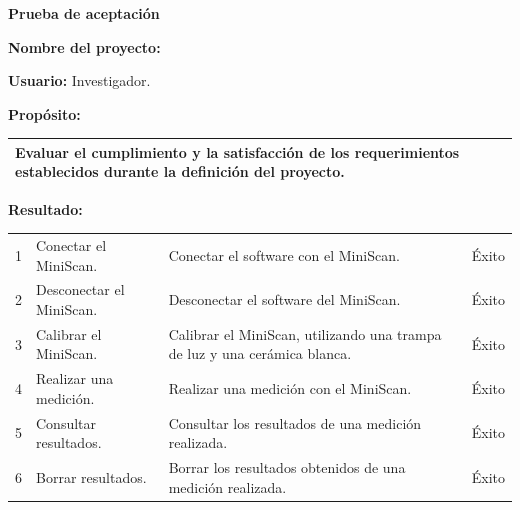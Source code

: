 {\newpage
\begin{center}
	\textbf{Prueba de aceptaci\'{o}n}
\end{center}

\textbf{Nombre del proyecto:} \proyecto

\textbf{Usuario:} Investigador.

\textbf{Prop\'{o}sito:}
\begin{table}[h]
	\centering
	\setlength{\extrarowheight}{\altocelda}
	\begin{tabularx}{\anchotabla}{|X|}
		\hline
		Evaluar el cumplimiento y la satisfacci\'{o}n de los requerimientos establecidos durante la definici\'{o}n del proyecto.\\ \hline
	\end{tabularx}
\end{table}

\textbf{Resultado:}

\begin{table}[h]
	\centering
	\setlength{\extrarowheight}{\altocelda}
	\begin{tabulary}{\anchotabla}{|c|L|J|c|}
		\hline
		\thead{\textbf{\small{\#}}} &  &  & \\ \hline

			1 & Conectar el \hbox{MiniScan}. & Conectar el software con el MiniScan. & \'{E}xito \\ \hline
		
			2 & Desconectar el \hbox{MiniScan}. & Desconectar el software del MiniScan. & \'{E}xito \\ \hline
			
			3 & Calibrar el \hbox{MiniScan}. & Calibrar el MiniScan, utilizando una trampa de luz y una cer\'{a}mica blanca. & \'{E}xito \\ \hline
			
			4 & Realizar una medici\'{o}n. & Realizar una medici\'{o}n con el MiniScan. & \'{E}xito \\ \hline
			
			5 & Consultar resultados. & Consultar los resultados de una medici\'{o}n realizada. & \'{E}xito \\ \hline
			
			6 & Borrar resultados. & Borrar los resultados obtenidos de una medici\'{o}n realizada. & \'{E}xito \\ \hline
			

\end{tabulary}
\end{table}}
